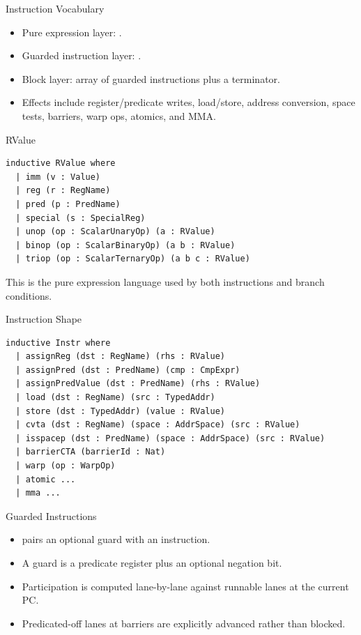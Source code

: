 \documentclass[aspectratio=169,10pt]{beamer}
\newcommand{\lean}[1]{\texttt{\detokenize{#1}}}
\begin{document}
\begin{frame}{Instruction Vocabulary}
  \begin{itemize}
    \item Pure expression layer: \lean{RValue}.
    \item Guarded instruction layer: \lean{GInstr}.
    \item Block layer: array of guarded instructions plus a terminator.
    \item Effects include register/predicate writes, load/store, address conversion, space tests, barriers, warp ops, atomics, and MMA.
  \end{itemize}
\end{frame}

\begin{frame}[fragile]{RValue}
\begin{lstlisting}
inductive RValue where
  | imm (v : Value)
  | reg (r : RegName)
  | pred (p : PredName)
  | special (s : SpecialReg)
  | unop (op : ScalarUnaryOp) (a : RValue)
  | binop (op : ScalarBinaryOp) (a b : RValue)
  | triop (op : ScalarTernaryOp) (a b c : RValue)
\end{lstlisting}

  This is the pure expression language used by both instructions and branch conditions.
\end{frame}

\begin{frame}[fragile]{Instruction Shape}
\begin{lstlisting}
inductive Instr where
  | assignReg (dst : RegName) (rhs : RValue)
  | assignPred (dst : PredName) (cmp : CmpExpr)
  | assignPredValue (dst : PredName) (rhs : RValue)
  | load (dst : RegName) (src : TypedAddr)
  | store (dst : TypedAddr) (value : RValue)
  | cvta (dst : RegName) (space : AddrSpace) (src : RValue)
  | isspacep (dst : PredName) (space : AddrSpace) (src : RValue)
  | barrierCTA (barrierId : Nat)
  | warp (op : WarpOp)
  | atomic ...
  | mma ...
\end{lstlisting}
\end{frame}

\begin{frame}{Guarded Instructions}
  \begin{itemize}
    \item \lean{GInstr} pairs an optional guard with an instruction.
    \item A guard is a predicate register plus an optional negation bit.
    \item Participation is computed lane-by-lane against runnable lanes at the current PC.
    \item Predicated-off lanes at barriers are explicitly advanced rather than blocked.
  \end{itemize}
\end{frame}
\end{document}
